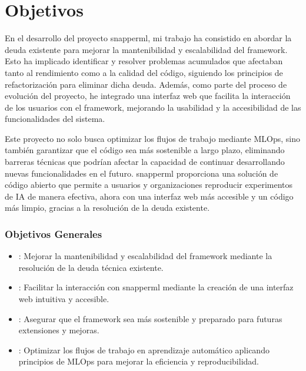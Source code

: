\section{Objetivos}

En el desarrollo del proyecto \Gls{snapperml}, mi trabajo ha consistido en abordar la \gls{deuda} existente para mejorar la mantenibilidad y escalabilidad del \gls{framework}. Esto ha implicado identificar y resolver problemas acumulados que afectaban tanto al rendimiento como a la calidad del código, siguiendo los principios de refactorización para eliminar dicha deuda. Además, como parte del proceso de evolución del proyecto, he integrado una interfaz web que facilita la interacción de los usuarios con el \gls{framework}, mejorando la usabilidad y la accesibilidad de las funcionalidades del sistema.

Este proyecto no solo busca optimizar los flujos de trabajo mediante MLOps, sino también garantizar que el código sea más sostenible a largo plazo, eliminando barreras técnicas que podrían afectar la capacidad de continuar desarrollando nuevas funcionalidades en el futuro. \Gls{snapperml} proporciona una solución de código abierto que permite a usuarios y organizaciones reproducir experimentos de IA de manera efectiva, ahora con una interfaz web más accesible y un código más limpio, gracias a la resolución de la \gls{deuda} existente.

\subsubsection{Objetivos Generales}
\begin{itemize}
    \item \textbf{}: Mejorar la mantenibilidad y escalabilidad del \gls{framework} mediante la resolución de la \gls{deuda} técnica existente.
    \item \textbf{}: Facilitar la interacción con \Gls{snapperml} mediante la creación de una interfaz web intuitiva y accesible.
    \item \textbf{}: Asegurar que el \gls{framework} sea más sostenible y preparado para futuras extensiones y mejoras.
    \item \textbf{}: Optimizar los flujos de trabajo en aprendizaje automático aplicando principios de MLOps para mejorar la eficiencia y reproducibilidad.
\end{itemize}

